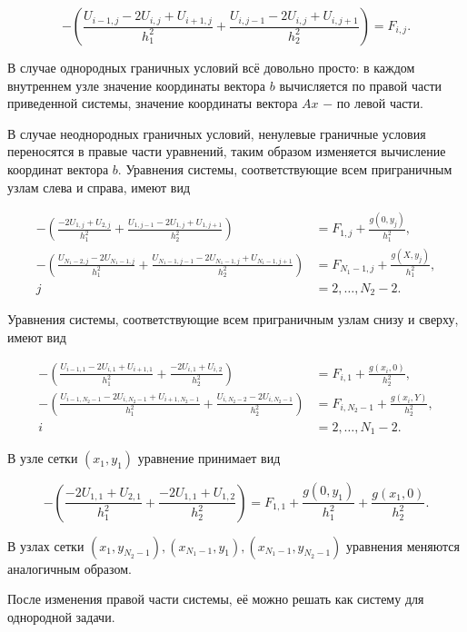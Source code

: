 \documentclass[a4paper, 12pt]{article} %
\begin{document}
\[ - \left( \frac{U_{i - 1, j} - 2 U_{i, j} + U_{i + 1, j}}{h^2_{1}} + \frac{U_{i, j - 1} - 2U_{i, j} + U_{i, j + 1}}{h_2^2} \right) = F_{i, j}. \]

В случае однородных граничных условий всё довольно просто: в каждом внутреннем узле значение координаты вектора $ b $ вычисляется по правой части приведенной системы, значение координаты вектора $ Ax $ $ - $ по левой части.

В случае неоднородных граничных условий, ненулевые граничные условия переносятся в правые части уравнений, таким образом изменяется вычисление координат вектора $ b $. Уравнения системы, соответствующие всем приграничным узлам слева и справа, имеют вид

\[ 
\begin{aligned}
- \left( \frac{-2U_{1, j} + U_{2, j}}{h_1^2} + \frac{U_{1, j - 1} - 2U_{1, j} + U_{1, j + 1}}{h_2^2} \right) &= F_{1, j} + \frac{g(0, y_j)}{h_1^2}, \\
- \left( \frac{U_{N_1 - 2, j} - 2U_{N_1 - 1, j}}{h_1^2} + \frac{U_{N_1 - 1, j - 1} - 2U_{N_1 - 1, j} + U_{N_1 - 1, j + 1}}{h_2^2} \right) &= F_{N_1 - 1, j} + \frac{g(X, y_j)}{h_1^2}, \\
j &= 2, \dots, N_2 - 2.
\end{aligned}
\]

Уравнения системы, соответствующие всем приграничным узлам снизу и сверху, имеют вид

\[
\begin{aligned}
- \left( \frac{U_{i - 1, 1} - 2U_{i, 1} + U_{i + 1, 1}}{h_1^2} + \frac{-2U_{i, 1} + U_{i, 2}}{h_2^2} \right) &= F_{i, 1} + \frac{g(x_i, 0)}{h_2^2} , \\
- \left(\frac{U_{i - 1, N_2 - 1} - 2U_{i, N_2 - 1} + U_{i + 1, N_2 - 1}}{h_1^2} + \frac{U_{i, N_2 - 2} - 2U_{i, N_2 - 1}}{h_2^2} \right) &= F_{i, N_2 - 1} + \frac{g(x_i, Y)}{h_2^2}, \\
i &= 2, \dots, N_1 - 2. 
\end{aligned}
\]

В узле сетки $ (x_1, y_1) $ уравнение принимает вид

\[
- \left( \frac{-2U_{1, 1} + U_{2, 1}}{h_1^2} + \frac{-2U_{1, 1} + U_{1, 2}}{h_2^2} \right) = F_{1, 1} + \frac{g(0, y_1)}{h_1^2} + \frac{g(x_1, 0)}{h_2^2}.
\]

В узлах сетки $ (x_1, y_{N_2 - 1}), (x_{N_1 - 1}, y_1), (x_{N_1 - 1}, y_{N_2 - 1}) $ уравнения меняются аналогичным образом.

После изменения правой части системы, её можно решать как систему для однородной задачи. 
\end{document}
